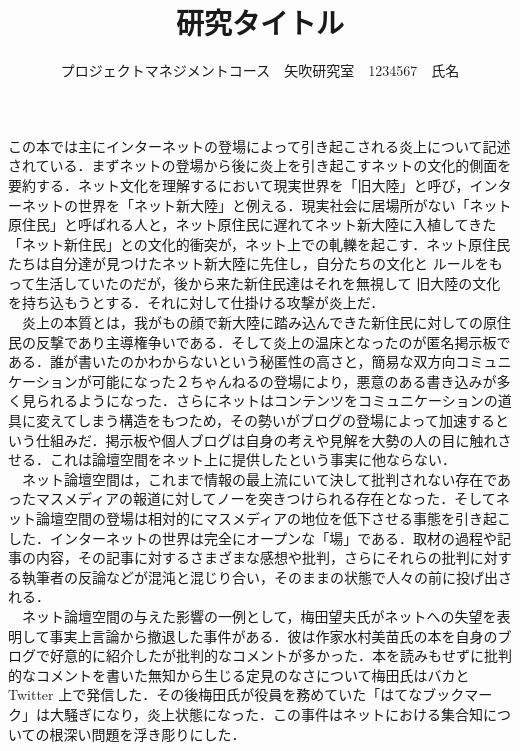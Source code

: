 \documentclass[uplatex,twocolumn,dvipdfmx]{jsarticle}
\title{\vspace{-5mm}\fontsize{14pt}{0pt}\selectfont 研究タイトル}
\author{\normalsize プロジェクトマネジメントコース　矢吹研究室　1234567　氏名}
\date{}
\begin{document}
\fontsize{10.5pt}{\baselineskip}\selectfont
\maketitle







この本では主にインターネットの登場によって引き起こされる炎上について記述されている．まずネットの登場から後に炎上を引き起こすネットの文化的側面を要約する．ネット文化を理解するにおいて現実世界を「旧大陸」と呼び，インターネットの世界を「ネット新大陸」と例える．現実社会に居場所がない「ネット原住民」と呼ばれる人と，ネット原住民に遅れてネット新大陸に入植してきた「ネット新住民」との文化的衝突が，ネット上での軋轢を起こす．ネット原住民たちは自分達が見つけたネット新大陸に先住し，自分たちの文化と ルールをもって生活していたのだが，後から来た新住民達はそれを無視して   旧大陸の文化を持ち込もうとする．それに対して仕掛ける攻撃が炎上だ．\\
　炎上の本質とは，我がもの顔で新大陸に踏み込んできた新住民に対しての原住民の反撃であり主導権争いである．そして炎上の温床となったのが匿名掲示板である．誰が書いたのかわからないという秘匿性の高さと，簡易な双方向コミュニケーションが可能になった２ちゃんねるの登場により，悪意のある書き込みが多く見られるようになった．さらにネットはコンテンツをコミュニケーションの道具に変えてしまう構造をもつため，その勢いがブログの登場によって加速するという仕組みだ．掲示板や個人ブログは自身の考えや見解を大勢の人の目に触れさせる．これは論壇空間をネット上に提供したという事実に他ならない．\\
　ネット論壇空間は，これまで情報の最上流にいて決して批判されない存在であったマスメディアの報道に対してノーを突きつけられる存在となった．そしてネット論壇空間の登場は相対的にマスメディアの地位を低下させる事態を引き起こした．インターネットの世界は完全にオープンな「場」である．取材の過程や記事の内容，その記事に対するさまざまな感想や批判，さらにそれらの批判に対する執筆者の反論などが混沌と混じり合い，そのままの状態で人々の前に投げ出される．\\
　ネット論壇空間の与えた影響の一例として，梅田望夫氏がネットへの失望を表明して事実上言論から撤退した事件がある．彼は作家水村美苗氏の本を自身のブログで好意的に紹介したが批判的なコメントが多かった．本を読みもせずに批判的なコメントを書いた無知から生じる定見のなさについて梅田氏はバカと Twitter 上で発信した．その後梅田氏が役員を務めていた「はてなブックマーク」は大騒ぎになり，炎上状態になった．この事件はネットにおける集合知についての根深い問題を浮き彫りにした．\\
\end{document}
